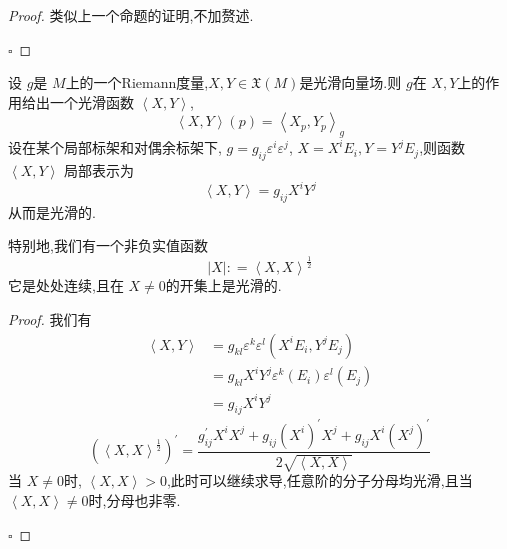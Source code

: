 \documentclass[../../几何与拓扑.tex]{subfiles}
\begin{document}
\begin{proof}
    类似上一个命题的证明,不加赘述.

    \hfill $\square$
\end{proof}

\begin{proposition}
    设 \(  g  \)是 \(  M  \)上的一个Riemann度量,\(  X,Y \in  \mathfrak{X}\left( M \right)   \)是光滑向量场.则 \(  g  \)在 \(  X,Y  \)上的作用给出一个光滑函数 \(  \left<X,Y \right>  \), \[
    \left<X,Y \right> \left( p \right) =  \left<X_{p},Y_{p} \right>_{g} 
    \]  设在某个局部标架和对偶余标架下, \(  g =  g_{ij} \varepsilon ^{i} \varepsilon ^{j}  \), \(  X =  X^{i} E_{i},Y =  Y^{j}E_{j}  \),则函数\(  \left<X,Y \right>  \) 局部表示为 \[
    \left<X,Y \right> =  g_{ij}X^{i}Y^{j}
    \]从而是光滑的.
    
    特别地,我们有一个非负实值函数 \[
    \left| X \right| : =  \left<X,X \right>^{\frac{1}{2}} 
    \]它是处处连续,且在 \(  X  \neq 0\)的开集上是光滑的. 
\end{proposition}

\begin{proof}
    我们有 \[
    \begin{aligned}
    \left<X,Y \right> & =  g_{kl} \varepsilon ^{k} \varepsilon ^{l} \left( X^{i}E_{i} , Y^{j}E_{j}\right)\\ 
     & =    g_{kl}X^{i}Y^{j}  \varepsilon ^{k}\left( E_{i} \right) \varepsilon ^{l}\left( E_{j} \right)  \\ 
      & =  g_{ij} X^{i}Y^{j}
    \end{aligned}
    \]
     \[
     \left( \left<X,X \right>^{\frac{1}{2}}  \right)^{\prime}  =  \frac{g_{ij}^{\prime} X^{i}X^{j}+  g_{ij}\left( X^{i} \right)^{\prime} X^{j}+ g_{ij}X^{i}\left( X^{j} \right)^{\prime}   }{2\sqrt{\left<X,X \right>}} 
     \]当 \(  X \neq 0  \)时, \( \left<X,X \right>>0 \),此时可以继续求导,任意阶的分子分母均光滑,且当 \(  \left<X,X \right>\neq 0  \)时,分母也非零.   

    \hfill $\square$
\end{proof}
\end{document}
